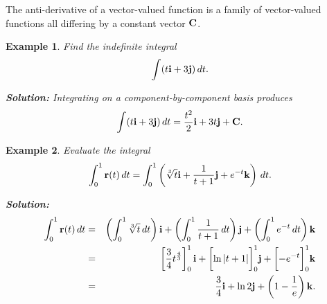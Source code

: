 \documentclass[titlepage,a4paper,12pt]{report}
\newtheorem{example}{Example}[section]
\begin{document}
\noindent The anti-derivative of a vector-valued function is a family of vector-valued functions all differing by a constant vector ${\bf{C}}$.
\begin{example} Find the indefinite integral
\[\int (t{\bf{i}}+3{\bf{j}})\, dt.\]

\noindent \textbf{Solution:} Integrating on a component-by-component basis produces 
\[\int (t{\bf{i}}+3{\bf{j}})\, dt =\dfrac{t^2}{2}{\bf{i}}+3t{\bf{j}}+{\bf{C}}.\]
\end{example}
\begin{example}
Evaluate the integral 
\[\int _0^1 {\bf{r}}(t)\, dt =\int _0^1 \left(\sqrt[3]{t}{\bf{i}}+\dfrac{1}{t+1}{\bf{j}}+e^{-t}{\bf{k}}\right)\, dt.\]

\noindent \textbf{Solution:} 
\begin{eqnarray*}
\int _0^1 {\bf{r}}(t)\, dt &=& \left(\int _0^1 \sqrt[3]{t}\, dt\right){\bf{i}} +\left(\int _0^1 \dfrac{1}{t+1}\, dt\right){\bf{j}}+\left(\int _0^1 e^{-t
}\, dt\right){\bf{k}}\\
&=& \left[\dfrac{3}{4}t^{\frac{4}{3}}\right]_0^1 {\bf{i}} +\biggl[\ln |t+1|\biggr]_0^1 {\bf{j}} +\biggl[-e^{-t}\biggr]_0^1 {\bf{k}}\\
&=& \dfrac{3}{4}{\bf{i}} +\ln 2 {\bf{j}}+\left(1-\dfrac{1}{e}\right){\bf{k}}.
\end{eqnarray*}
\end{example}
\end{document}
